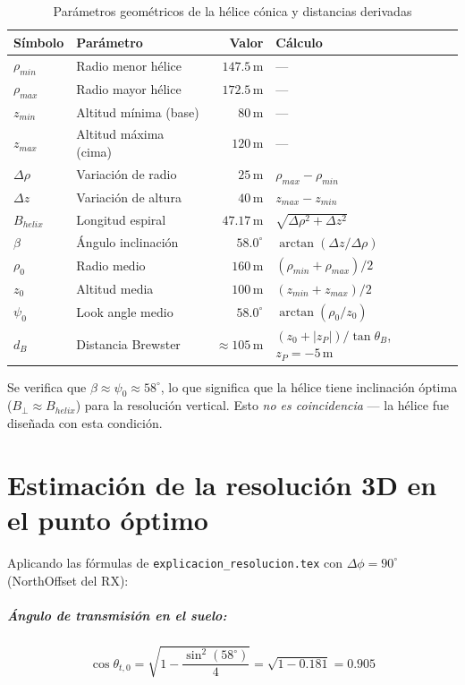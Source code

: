 \documentclass[12pt,a4paper,oneside]{book}
\newcommand{\thetaB}{\theta_B}
\begin{document}
\begin{table}[H]
\centering
\caption{Parámetros geométricos de la hélice cónica y distancias derivadas}
\label{tab:geometry}
\begin{tabular}{llrl}
\toprule
Símbolo & Parámetro & Valor & Cálculo \\
\midrule
$\rho_{min}$ & Radio menor hélice & $147.5\,\text{m}$ & — \\
$\rho_{max}$ & Radio mayor hélice & $172.5\,\text{m}$ & — \\
$z_{min}$ & Altitud mínima (base) & $80\,\text{m}$ & — \\
$z_{max}$ & Altitud máxima (cima) & $120\,\text{m}$ & — \\
$\Delta\rho$ & Variación de radio & $25\,\text{m}$ & $\rho_{max}-\rho_{min}$ \\
$\Delta z$ & Variación de altura & $40\,\text{m}$ & $z_{max}-z_{min}$ \\
$B_{helix}$ & Longitud espiral & $47.17\,\text{m}$ & $\sqrt{\Delta\rho^2+\Delta z^2}$ \\
$\beta$ & Ángulo inclinación & $58.0^\circ$ & $\arctan(\Delta z/\Delta\rho)$ \\
$\rho_0$ & Radio medio & $160\,\text{m}$ & $(\rho_{min}+\rho_{max})/2$ \\
$z_0$ & Altitud media & $100\,\text{m}$ & $(z_{min}+z_{max})/2$ \\
$\psi_0$ & Look angle medio & $58.0^\circ$ & $\arctan(\rho_0/z_0)$ \\
$d_B$ & Distancia Brewster & $\approx 105\,\text{m}$ & $(z_0+|z_P|)/\tan\thetaB$, $z_P=-5\,\text{m}$ \\
\bottomrule
\end{tabular}
\end{table}

Se verifica que $\beta \approx \psi_0 \approx 58^\circ$, lo que significa que la hélice tiene inclinación óptima ($B_\perp \approx B_{helix}$) para la resolución vertical. Esto \emph{no es coincidencia} — la hélice fue diseñada con esta condición.

\section{Estimación de la resolución 3D en el punto óptimo}

Aplicando las fórmulas de \texttt{explicacion\_resolucion.tex} con $\Delta\phi=90^\circ$ (NorthOffset del RX):

\subparagraph{Ángulo de transmisión en el suelo:}
\[
\cos\theta_{t,0} = \sqrt{1-\frac{\sin^2(58^\circ)}{4}} = \sqrt{1-0.181} = 0.905
\]
\end{document}
